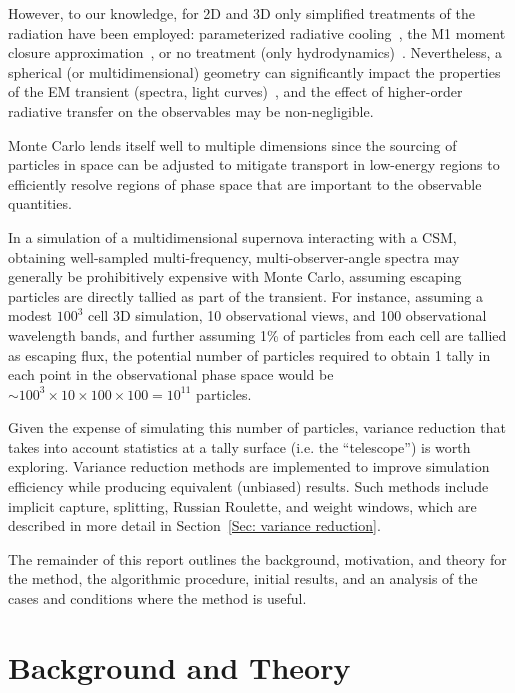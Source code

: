 However, to our knowledge, for 2D and 3D only simplified treatments of the radiation have been employed: parameterized radiative cooling~\cite{MS10,MK12}, the M1 moment closure approximation~\cite{VL16}, or no treatment (only hydrodynamics)~\cite{MP18}. Nevertheless, a spherical (or multidimensional) geometry can significantly impact the properties of the EM transient (spectra, light curves)~\cite{VL16,MP18}, and the effect of higher-order radiative transfer on the observables may be non-negligible.

Monte Carlo lends itself well to multiple dimensions since the sourcing of particles in space can be adjusted to mitigate transport in low-energy regions to efficiently resolve regions of phase space that are important to the observable quantities.

In a simulation of a multidimensional supernova interacting with a CSM, obtaining well-sampled multi-frequency, multi-observer-angle spectra may generally be prohibitively expensive with Monte Carlo, assuming escaping particles are directly tallied as part of the transient. For instance, assuming a modest $100^3$ cell 3D simulation, 10 observational views, and 100 observational wavelength bands, and further assuming 1\% of particles from each cell are tallied as escaping flux, the potential number of particles required to obtain 1 tally in each point in the observational phase space would be $\sim 100^3 \times 10 \times 100 \times 100 = 10^{11}$ particles.

Given the expense of simulating this number of particles, variance reduction that takes into account statistics at a tally surface (i.e. the ``telescope'') is worth exploring. Variance reduction methods are implemented to improve simulation efficiency while producing equivalent (unbiased) results. Such methods include implicit capture, splitting, Russian Roulette, and weight windows, which are described in more detail in Section~\ref{Sec: variance reduction}.

The remainder of this report outlines the background, motivation, and theory for the method, the algorithmic procedure, initial results, and an analysis of the cases and conditions where the method is useful.

\section{Background and Theory}
